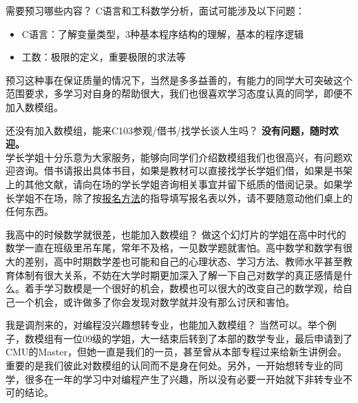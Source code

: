 \documentclass[xcolor={usenames,dvipsnames}]{beamer}
\begin{document}
\begin{frame}
\begin{alertblock}{需要预习哪些内容？}
C语言和工科数学分析，面试可能涉及以下问题：
\begin{itemize}
    \item C语言：了解变量类型，3种基本程序结构的理解，基本的程序逻辑
    \item 工数：极限的定义，重要极限的求法等
\end{itemize}
预习这种事在保证质量的情况下，当然是多多益善的，有能力的同学大可突破这个范围要求，多学习对自身的帮助很大，我们也很喜欢学习态度认真的同学，即便不加入数模组。
\end{alertblock}

\begin{block}{还没有加入数模组，能来C103参观/借书/找学长谈人生吗？}
\textbf{没有问题，随时欢迎。}\\
学长学姐十分乐意为大家服务，能够向同学们介绍数模组我们也很高兴，有问题欢迎咨询。借书请报出具体书目，如果是教材可以直接找学长学姐们借，如果是书架上的其他文献，请向在场的学长学姐咨询相关事宜并留下纸质的借阅记录。如果学长学姐不在场，除了按\textcolor{blue}{\hyperlink{signin}{报名方法}}的指导填写报名表以外，请不要随意动他们桌上的任何东西。

\end{block}
\end{frame}

\begin{frame}
\begin{block}{我高中的时候数学就很差，也能加入数模组？}
做这个幻灯片的学姐在高中时代的数学一直在班级里吊车尾，常年不及格，一见数学题就害怕。高中数学和数学有很大的差别，高中时期数学差也可能和自己的心理状态、学习方法、教师水平甚至教育体制有很大关系，不妨在大学时期更加深入了解一下自己对数学的真正感情是什么。着手学习数模是一个很好的机会，数模也可以很大的改变自己的数学观，给自己一个机会，或许做多了你会发现对数学就并没有那么讨厌和害怕。
\end{block}
\begin{alertblock}{我是调剂来的，对编程没兴趣想转专业，也能加入数模组？}
当然可以。举个例子，数模组有一位09级的学姐，大一结束后转到了本部的数学专业，最后申请到了CMU的Master，但她一直是我们的一员，甚至曾从本部专程过来给新生讲例会。重要的是我们彼此对数模组的认同而不是身在何处。另外，一开始想转专业的同学，很多在一年的学习中对编程产生了兴趣，所以没有必要一开始就下非转专业不可的结论。
\end{alertblock}
\end{frame}
\end{document}
